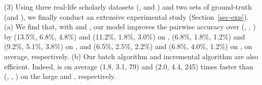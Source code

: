 \sstab(3) Using three real-life scholarly datasets (\aan, \aminer and \magdata) and two sets of ground-truth (\recom and \fcita), we finally conduct an extensive experimental study (Section~\ref{sec-exp}).
(a) We find that, with \recom and \fcita, our model \ensemblerank improves the pairwise accuracy \cite{Richardson06:BPR} over (\pagerank \cite{Brin98:PageRank}, \futurerank \cite{sayyadi09}, \hhgrank \cite{Liang16AAAI}) by
(13.5\%, 6.8\%, 4.8\%) and (11.2\%, 1.8\%, 3.0\%) on \aan,
(6.8\%, 1.8\%, 1.2\%) and (9.2\%, 5.1\%, 3.8\%) on \aminer, and
(6.5\%, 2.5\%, 2.2\%) and (6.8\%, 4.0\%, 1.2\%) on \magdata, on average, respectively.
%
(b) Our batch algorithm \batensemble and incremental algorithm \incensemble are also efficient. Indeed, \incensemble is on average (1.8, 3.1, 79) and (2.0, 4.4, 245) times faster than (\batensemble, \futurerank, \hhgrank)  on the large \aminer and \magdata, respectively.







